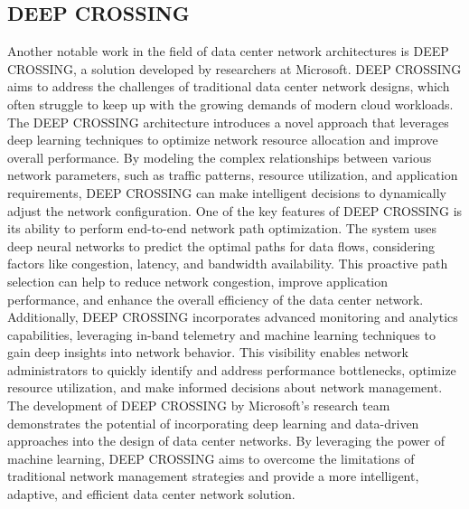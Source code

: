 \documentclass{sigkddExp}
\begin{document}
\subsection{DEEP CROSSING}
\vspace{3mm}
Another notable work in the field of data center network architectures is DEEP CROSSING, a solution developed by researchers at Microsoft. DEEP CROSSING aims to address the challenges of traditional data center network designs, which often struggle to keep up with the growing demands of modern cloud workloads.
\vspace{3mm}\newline
The DEEP CROSSING architecture introduces a novel approach that leverages deep learning techniques to optimize network resource allocation and improve overall performance. By modeling the complex relationships between various network parameters, such as traffic patterns, resource utilization, and application requirements, DEEP CROSSING can make intelligent decisions to dynamically adjust the network configuration.
\vspace{3mm}\newline
One of the key features of DEEP CROSSING is its ability to perform end-to-end network path optimization. The system uses deep neural networks to predict the optimal paths for data flows, considering factors like congestion, latency, and bandwidth availability. This proactive path selection can help to reduce network congestion, improve application performance, and enhance the overall efficiency of the data center network.
\vspace{3mm}\newline
Additionally, DEEP CROSSING incorporates advanced monitoring and analytics capabilities, leveraging in-band telemetry and machine learning techniques to gain deep insights into network behavior. This visibility enables network administrators to quickly identify and address performance bottlenecks, optimize resource utilization, and make informed decisions about network management.
\vspace{3mm}\newline
The development of DEEP CROSSING by Microsoft's research team demonstrates the potential of incorporating deep learning and data-driven approaches into the design of data center networks. By leveraging the power of machine learning, DEEP CROSSING aims to overcome the limitations of traditional network management strategies and provide a more intelligent, adaptive, and efficient data center network solution.
\end{document}
